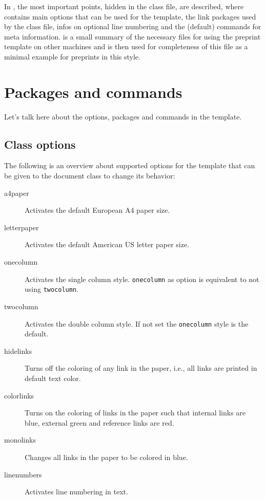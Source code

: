 \documentclass[%
  a4paper,
  twocolumn,
  colorlinks,
]{preprint}
\begin{document}
In , the most important points, hidden in the class file, are
described, where  contains main options that can be used
for the template,  the link packages used by the 
class file,  infos on optional line numbering and
 the (default) commands for meta information.
 is a small summary of the necessary files for using the
preprint template on other machines and  is then used for
completeness of this file as a minimal example for preprints in this style.



\section{Packages and commands}%
\label{sec:pkgcmd}

Let's talk here about the options, packages and commands in the template.


\subsection{Class options}%
\label{subsec:options}

The following is an overview about supported options for the template that can
be given to the document class to change its behavior:

\begin{description}
  \item[a4paper] Activates the default European A4 paper size.
  \item[letterpaper] Activates the default American US letter paper size.
  \item[onecolumn] Activates the single column style. \texttt{onecolumn}
    as option is equivalent to not using \texttt{twocolumn}.
  \item[twocolumn] Activates the double column style. If not set the 
    \texttt{onecolumn} style is the default.
  \item[hidelinks] Turns off the coloring of any link in the paper, i.e., all
    links are printed in default text color.
  \item[colorlinks] Turns on the coloring of links in the paper such that
    internal links are blue, external green and reference links are red.
  \item[monolinks] Changes all links in the paper to be colored in blue.
  \item[linenumbers] Activates line numbering in text.
\end{description}
\end{document}
